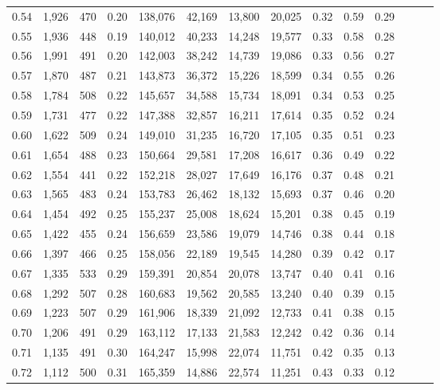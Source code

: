\begin{tabular}{rrrrrrrrrrrrrr}
0.54 &  1,926 &  470 &  0.20 &  138,076 &   42,169 &  13,800 &  20,025 &  0.32 &  0.59 &      0.29 \\
0.55 &  1,936 &  448 &  0.19 &  140,012 &   40,233 &  14,248 &  19,577 &  0.33 &  0.58 &      0.28 \\
0.56 &  1,991 &  491 &  0.20 &  142,003 &   38,242 &  14,739 &  19,086 &  0.33 &  0.56 &      0.27 \\
0.57 &  1,870 &  487 &  0.21 &  143,873 &   36,372 &  15,226 &  18,599 &  0.34 &  0.55 &      0.26 \\
0.58 &  1,784 &  508 &  0.22 &  145,657 &   34,588 &  15,734 &  18,091 &  0.34 &  0.53 &      0.25 \\
0.59 &  1,731 &  477 &  0.22 &  147,388 &   32,857 &  16,211 &  17,614 &  0.35 &  0.52 &      0.24 \\
0.60 &  1,622 &  509 &  0.24 &  149,010 &   31,235 &  16,720 &  17,105 &  0.35 &  0.51 &      0.23 \\
0.61 &  1,654 &  488 &  0.23 &  150,664 &   29,581 &  17,208 &  16,617 &  0.36 &  0.49 &      0.22 \\
0.62 &  1,554 &  441 &  0.22 &  152,218 &   28,027 &  17,649 &  16,176 &  0.37 &  0.48 &      0.21 \\
0.63 &  1,565 &  483 &  0.24 &  153,783 &   26,462 &  18,132 &  15,693 &  0.37 &  0.46 &      0.20 \\
0.64 &  1,454 &  492 &  0.25 &  155,237 &   25,008 &  18,624 &  15,201 &  0.38 &  0.45 &      0.19 \\
0.65 &  1,422 &  455 &  0.24 &  156,659 &   23,586 &  19,079 &  14,746 &  0.38 &  0.44 &      0.18 \\
0.66 &  1,397 &  466 &  0.25 &  158,056 &   22,189 &  19,545 &  14,280 &  0.39 &  0.42 &      0.17 \\
0.67 &  1,335 &  533 &  0.29 &  159,391 &   20,854 &  20,078 &  13,747 &  0.40 &  0.41 &      0.16 \\
0.68 &  1,292 &  507 &  0.28 &  160,683 &   19,562 &  20,585 &  13,240 &  0.40 &  0.39 &      0.15 \\
0.69 &  1,223 &  507 &  0.29 &  161,906 &   18,339 &  21,092 &  12,733 &  0.41 &  0.38 &      0.15 \\
0.70 &  1,206 &  491 &  0.29 &  163,112 &   17,133 &  21,583 &  12,242 &  0.42 &  0.36 &      0.14 \\
0.71 &  1,135 &  491 &  0.30 &  164,247 &   15,998 &  22,074 &  11,751 &  0.42 &  0.35 &      0.13 \\
0.72 &  1,112 &  500 &  0.31 &  165,359 &   14,886 &  22,574 &  11,251 &  0.43 &  0.33 &      0.12 \\

\end{tabular}
